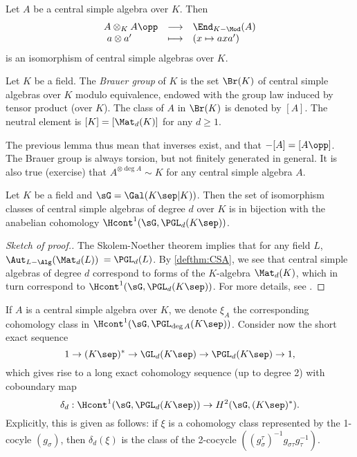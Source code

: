 \begin{lem}
Let $A$ be a central simple algebra over $K$. Then
$$
\begin{array}{lcl}
A \otimes_K A\opp & \longrightarrow & \End_{K-\Mod}(A) \\
\ a \otimes a' & \longmapsto & (x \mapsto a x a')
\end{array}
$$
is an isomorphism of central simple algebras over $K$.
\end{lem}

\begin{defi}
Let $K$ be a field. The \emph{Brauer group} of $K$ is the set $\Br (K)$ of central simple algebras over $K$ modulo equivalence, endowed with the group law induced by tensor product (over $K$). The class of $A$ in $\Br (K)$ is denoted by $[A]$. The neutral element is $[K] = [\Mat_d(K)]$ for any $d \geqslant 1$.
\end{defi}

The previous lemma thus mean that inverses exist, and that $-[A] = [A\opp]$. The Brauer group is always torsion, but not finitely generated in general. It is also true (exercise) that $A^{\otimes \deg A} \sim K$ for any central simple algebra $A$.

\begin{lem}
Let $K$ be a field and $\sG = \Gal (K\sep|K))$. Then the set of isomorphism classes of central simple algebras of degree $d$ over $K$ is in bijection with the anabelian cohomology $\Hcont^1 (\sG, \PGL_d(K\sep))$.
\end{lem}

\begin{proof}[Sketch of proof.]
The Skolem-Noether theorem implies that for any field $L$, $\Aut_{L-\Alg}(\Mat_d(L))$ $ = \PGL_d(L)$. By \ref{defthm:CSA}, we see that central simple algebras of degree $d$ correspond to forms of the $K$-algebra $\Mat_d(K)$, which in turn correspond to $\Hcont^1 (\sG, \PGL_d(K\sep))$. For more details, see \cite{Silverman:EllipticCurves}.
\end{proof}

If $A$ is a central simple algebra over $K$, we denote $\xi_A$ the corresponding cohomology class in $\Hcont^1 (\sG, \PGL_{\deg A}(K\sep))$. Consider now the short exact sequence 
$$
1 \to (K\sep)^* \to \GL_d(K\sep) \to \PGL_d(K\sep) \to 1,
$$
 which gives rise to a long exact cohomology sequence (up to degree 2) with coboundary map 
 $$
 \delta_d : \Hcont ^1(\sG, \PGL_d(K\sep)) \to H^2 (\sG, (K\sep)^*).
 $$ 
Explicitly, this is given as follows: if $\xi$ is a cohomology class represented by the 1-cocyle $(g_\sigma)$, then $\delta_d(\xi)$ is the class of the 2-cocycle $((g_\sigma^\tau)^{-1} g_{\sigma \tau} g_\tau^{-1})$. 

